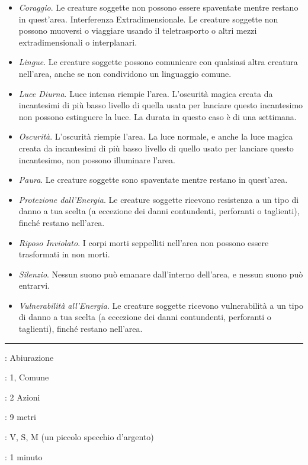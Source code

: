 \begin{multicols}{2}
\begin{itemize}[leftmargin=*] \setlength{\itemsep}{0pt}
	\item \emph{Coraggio}. Le creature soggette non possono essere spaventate mentre restano in quest'area. Interferenza Extradimensionale. Le creature soggette non possono muoversi o viaggiare usando il teletrasporto o altri mezzi extradimensionali o interplanari.
	\item \emph{Lingue}. Le creature soggette possono comunicare con qualsiasi altra creatura nell'area, anche se non condividono un linguaggio comune.
	\item \emph{Luce Diurna}. Luce intensa riempie l'area. L'oscurità magica creata da incantesimi di più basso livello di quella usata per lanciare questo incantesimo non possono estinguere la luce. La durata in questo caso è di una settimana.
	\item \emph{Oscurità}. L'oscurità riempie l'area. La luce normale, e anche la luce magica creata da incantesimi di più basso livello di quello usato per lanciare questo incantesimo, non possono illuminare l'area.
	\item \emph{Paura}. Le creature soggette sono spaventate mentre restano in quest'area.
	\item \emph{Protezione dall'Energia}. Le creature soggette ricevono resistenza a un tipo di danno a tua scelta (a eccezione dei danni contundenti, perforanti o taglienti), finché restano nell'area.
	\item \emph{Riposo Inviolato}. I corpi morti seppelliti nell'area non possono essere trasformati in non morti.
	\item \emph{Silenzio}. Nessun suono può emanare dall'interno dell'area, e nessun suono può entrarvi.
	\item \emph{Vulnerabilità all'Energia}. Le creature soggette ricevono vulnerabilità a un tipo di danno a tua scelta (a eccezione dei danni contundenti, perforanti o taglienti), finché restano nell'area.
\end{itemize}

\smallskip\noindent\rule{\linewidth}{2pt} \hypertarget{Santuario}{}\medskip{}
\noindent
\begin{description}[noitemsep, topsep=0pt, parsep=0pt, partopsep=0pt, leftmargin=0cm, labelwidth=2.8cm]
	\item[\textbf{Lista di Magia}]: Abiurazione
	\item[\textbf{Livello}]: 1, Comune
	\item[\textbf{T. di Lancio}]: 2 Azioni
	\item[\textbf{Gittata}]: 9 metri
	\item[\textbf{Componenti}]: V, S, M (un piccolo specchio d'argento)
	\item[\textbf{Durata}]: 1 minuto
\end{description}


\end{multicols}

